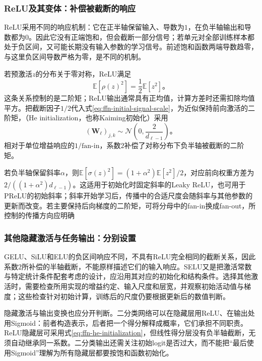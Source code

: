\subsubsection{ReLU及其变体：补偿被截断的响应}
\label{sec:ffn-initialization-rectifiers}

ReLU采用不同的响应机制：它在正半轴保留输入、导数为$1$，在负半轴输出和导数都为$0$。因此它没有正端饱和，但会截断一部分信号；若单元对全部训练样本都处于负区间，又可能长期没有输入参数的学习信号。前述饱和函数两端导数趋零，与这里负区间导数严格为零，是不同的机制。

若预激活$z$的分布关于零对称，ReLU满足
\[
  \mathbb{E}[\rho(z)^2]=\frac12\mathbb{E}[z^2]\text{。}
\]
这条关系控制的是二阶矩；ReLU输出通常具有正均值，计算方差时还需扣除均值平方。把截断因子$1/2$代入式\eqref{eq:ffn-initial-signal-scale}，为近似保持前向激活的二阶矩，（He initialization，也称Kaiming初始化）采用
\begin{equation}
  (\bm{W}_\ell)_{j,k}\sim
  \mathcal{N}\!\left(0,\frac{2}{d_{\ell-1}}\right)\text{。}
  \label{eq:ffn-he-initialization}
\end{equation}
相对于单位增益响应的$1/\mathrm{fan\text{-}in}$，系数$2$补偿了对称分布下负半轴被截断的二阶矩。

若负半轴保留斜率$\alpha$，则$\mathbb{E}[\sigma(z)^2]=(1+\alpha^2)\mathbb{E}[z^2]/2$，对应前向权重方差为$2/((1+\alpha^2)d_{\ell-1})$。这适用于初始化时固定斜率的Leaky ReLU，也可用于PReLU的初始斜率；斜率开始学习后，传播中的合适尺度会随斜率与其他参数的更新而改变。若主要保持后向梯度的二阶矩，可将分母中的fan-in换成fan-out，所控制的传播方向应明确

\subsubsection{其他隐藏激活与任务输出：分别设置}
\label{sec:ffn-initialization-other}

GELU、SiLU和ELU的负区间响应不同，不具有ReLU完全相同的截断关系，因此系数$2$所补偿的半轴截断，不能原样描述它们的输入响应。SELU又是把激活常数与特定统计条件配套考虑的设计，应沿用其对应的初始化和结构条件。选择其他激活时，需要检查所用实现的增益约定、输入尺度和层宽，并观察初始活动值与梯度；这些检查针对初始计算，训练后的尺度仍要根据更新后的数值判断。

隐藏激活与输出变换也应分开判断。二分类网络可以在隐藏层用ReLU、在输出处用Sigmoid：前者构造表示，后者把一个得分解释成概率，它们承担不同职责。ReLU隐藏层可采用式\eqref{eq:ffn-he-initialization}，但线性得分层没有负半轴截断，无须自动继承同一系数。二分类输出还需关注初始logit是否过大，而不能把“最后使用Sigmoid”理解为所有隐藏层都要按饱和函数初始化。

